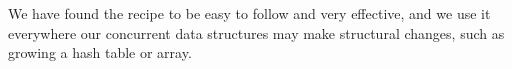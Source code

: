 \documentclass[10pt,letterpaper,twocolumn,english]{article}
\newcommand{\yad}{Lemon\xspace}
\begin{document}
We have found the recipe to be easy to follow and very effective, and
we use it everywhere our concurrent data structures may make structural 
changes, such as growing a hash table or array.




\end{document}
